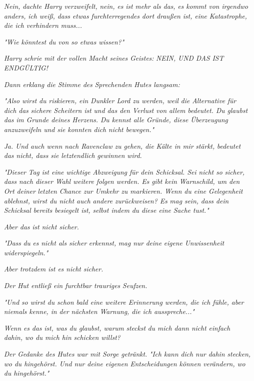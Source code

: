 {\emph{Nein,} \emph{dachte Harry verzweifelt,} \emph{\emph{nein, es ist mehr als das, es kommt von irgendwo anders, ich weiß, dass etwas furchterregendes dort draußen ist, eine Katastrophe, die ich verhindern muss...}}

\emph{"Wie könntest du von so etwas wissen?"}

\emph{Harry schrie mit der vollen Macht seines Geistes:} \emph{\emph{NEIN, UND DAS IST ENDGÜLTIG!}}

\emph{Dann erklang die Stimme des Sprechenden Hutes langsam:}

\emph{\emph{"Also wirst du riskieren, ein Dunkler Lord zu werden, weil die Alternative für dich das sichere Scheitern ist und das den Verlust von allem bedeutet. Du glaubst das im Grunde deines Herzens. Du kennst alle Gründe, diese Überzeugung anzuzweifeln und sie konnten dich nicht bewegen."}}

\emph{Ja. Und auch wenn nach Ravenclaw zu gehen, die Kälte in mir} \emph{stärkt,} \emph{\emph{bedeutet das nicht, dass sie letztendlich}} \emph{gewinnen} \emph{\emph{wird.}}

\emph{"Dieser Tag ist eine wichtige Abzweigung für dein Schicksal. Sei nicht so sicher, dass nach dieser Wahl weitere folgen werden. Es gibt kein Warnschild, um den Ort deiner} \emph{letzten} \emph{\emph{Chance zur Umkehr zu markieren. Wenn du eine Gelegenheit ablehnst, wirst du nicht auch andere zurückweisen? Es mag sein, dass dein Schicksal bereits besiegelt ist, selbst indem du diese eine Sache tust."}}

\emph{Aber das ist nicht sicher.}

\emph{"Dass} \emph{du} \emph{\emph{es nicht als sicher}} \emph{erkennst,} \emph{\emph{mag nur}} \emph{deine} \emph{\emph{eigene Unwissenheit widerspiegeln."}}

\emph{Aber trotzdem ist es nicht sicher.}

\emph{Der Hut entließ ein furchtbar trauriges Seufzen.}

\emph{\emph{"Und so wirst du schon bald eine weitere Erinnerung werden, die ich fühle, aber niemals kenne, in der nächsten Warnung, die ich ausspreche..."}}

\emph{Wenn es das ist, was du glaubst, warum} \emph{steckst} \emph{\emph{du mich dann nicht einfach dahin, wo du mich hin schicken willst?}}

\emph{Der Gedanke des Hutes war mit Sorge getränkt.} \emph{\emph{"Ich kann dich nur dahin stecken, wo du hingehörst. Und nur deine eigenen Entscheidungen können verändern, wo du hingehörst."}}

}
